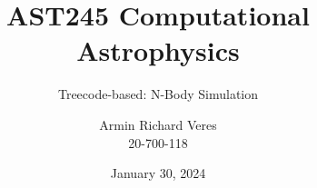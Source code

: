 \documentclass[
	9pt, %
]{beamer}
\title[AST245]{AST245 Computational Astrophysics} %
\subtitle{Treecode-based: N-Body Simulation} %
\author[Armin R. Veres]{Armin Richard Veres\\ 20-700-118} %
\date{January 30, 2024}
\begin{document}

\begin{frame}
	\titlepage %
\end{frame}



\begin{frame}
	\tableofcontents %
\end{frame}






\end{document}
